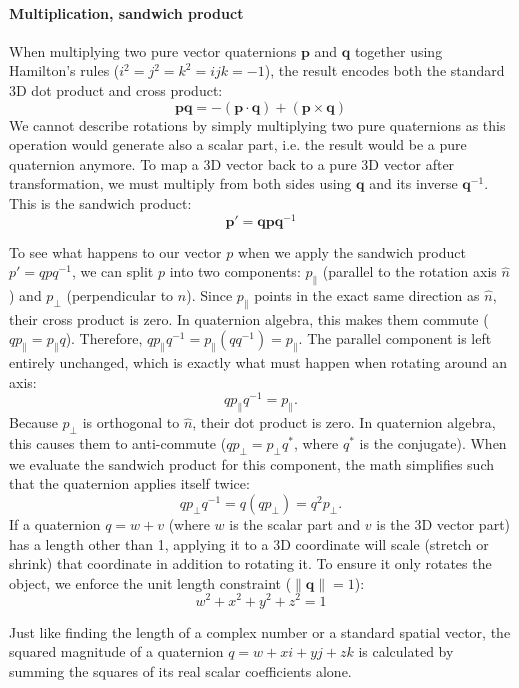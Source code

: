 \paragraph{Multiplication, sandwich product}
When multiplying two pure vector quaternions $\mathbf{p}$ and $\mathbf{q}$ together using Hamilton's rules ($i^2=j^2=k^2=ijk=-1$), the result encodes both the standard 3D dot product and cross product:
$$\mathbf{p}\mathbf{q} = -(\mathbf{p} \cdot \mathbf{q}) + (\mathbf{p} \times \mathbf{q})$$
We cannot describe rotations by simply multiplying two pure quaternions as this operation would generate also a scalar part, i.e. the result would be a pure quaternion anymore.
To map a 3D vector back to a pure 3D vector after transformation, we must multiply from both sides using $\mathbf{q}$ and its inverse $\mathbf{q}^{-1}$. This is the sandwich product:
$$\mathbf{p}' = \mathbf{q} \mathbf{p} \mathbf{q}^{-1}$$

To see what happens to our vector $p$ when we apply the sandwich product $p' = q p q^{-1}$, we can split $p$ into two components: $p_\parallel$ (parallel to the rotation axis $\hat{n}$) and $p_\perp$ (perpendicular to $\hat{n}$).
Since $p_\parallel$ points in the exact same direction as $\hat{n}$, their cross product is zero. In quaternion algebra, this makes them commute ($q p_\parallel = p_\parallel q$). Therefore, $q p_\parallel q^{-1} = p_\parallel (q q^{-1}) = p_\parallel$. The parallel component is left entirely unchanged, which is exactly what must happen when rotating around an axis:
$$qp_{\parallel}q^{-1}=p_{\parallel}.$$
Because $p_\perp$ is orthogonal to $\hat{n}$, their dot product is zero. In quaternion algebra, this causes them to anti-commute ($q p_\perp = p_\perp q^*$, where $q^*$ is the conjugate). When we evaluate the sandwich product for this component, the math simplifies such that the quaternion applies itself twice:
$$q p_\perp q^{-1} = q (q p_\perp) = q^2 p_\perp.$$
If a quaternion $q = w + v$ (where $w$ is the scalar part and $v$ is the 3D vector part) has a length other than 1, applying it to a 3D coordinate will scale (stretch or shrink) that coordinate in addition to rotating it. To ensure it only rotates the object, we enforce the unit length constraint ($\| \mathbf{q} \| = 1$): 
$$w^2 + x^2 + y^2 + z^2 = 1$$

\begin{observation}{}
    Just like finding the length of a complex number or a standard spatial vector, the squared magnitude of a quaternion $q = w + xi + yj + zk$ is calculated by summing the squares of its real scalar coefficients alone.
\end{observation}

